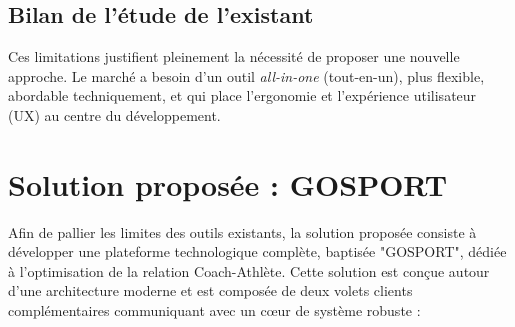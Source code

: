 \begin{table}[H]
\centering
\renewcommand{\arraystretch}{1.5}
\caption{Comparaison des solutions existantes avec GOSPORT}
\end{table}

\subsection{Bilan de l'étude de l'existant}
Ces limitations justifient pleinement la nécessité de proposer une nouvelle approche. Le marché a besoin d'un outil \textit{all-in-one} (tout-en-un), plus flexible, abordable techniquement, et qui place l'ergonomie et l'expérience utilisateur (UX) au centre du développement.

\section{Solution proposée : GOSPORT}
Afin de pallier les limites des outils existants, la solution proposée consiste à développer une plateforme technologique complète, baptisée "GOSPORT", dédiée à l'optimisation de la relation Coach-Athlète. Cette solution est conçue autour d'une architecture moderne et est composée de deux volets clients complémentaires communiquant avec un cœur de système robuste :

